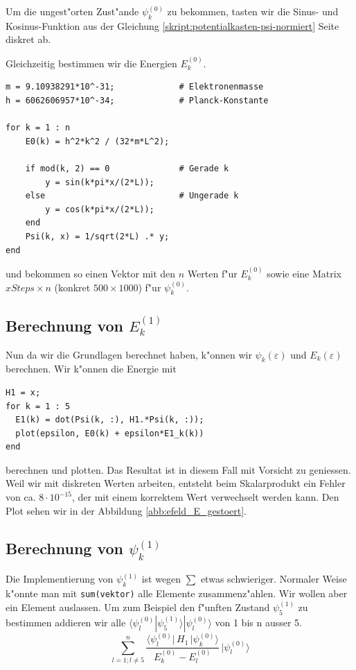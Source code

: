 \begin{refsection}
Um die ungest"orten Zust"ande $\psi_k^{(0)}$ zu bekommen, tasten wir die Sinus- und Kosinus-Funktion 
aus der Gleichung \ref{skript:potentialkasten-psi-normiert} Seite \pageref{skript:potentialkasten-psi-normiert} diskret ab.

Gleichzeitig bestimmen wir die Energien $E_k^{(0)}$.
\begin{lstlisting}[style=Matlab]
m = 9.10938291*10^-31;             # Elektronenmasse
h = 6062606957*10^-34;             # Planck-Konstante

for k = 1 : n
    E0(k) = h^2*k^2 / (32*m*L^2);
    
    if mod(k, 2) == 0              # Gerade k
        y = sin(k*pi*x/(2*L));
    else                           # Ungerade k
        y = cos(k*pi*x/(2*L));
    end
    Psi(k, x) = 1/sqrt(2*L) .* y;
end
\end{lstlisting}
und bekommen so einen Vektor mit den $n$ Werten f"ur $E_k^{(0)}$
sowie eine Matrix $xSteps \times n$ (konkret $500 \times 1000$) f"ur $\psi_k^{(0)}$.

\subsection{Berechnung von $E_k^{(1)}$}

Nun da wir die Grundlagen berechnet haben, k"onnen wir $\psi_k(\varepsilon)$ und $E_k(\varepsilon)$ berechnen.
Wir k"onnen die Energie mit
\begin{lstlisting}[style=Matlab]
H1 = x;
for k = 1 : 5
  E1(k) = dot(Psi(k, :), H1.*Psi(k, :));
  plot(epsilon, E0(k) + epsilon*E1_k(k))
end
\end{lstlisting}
berechnen und plotten.
Das Resultat ist in diesem Fall mit Vorsicht zu geniessen.
Weil wir mit diskreten Werten arbeiten, entsteht beim Skalarprodukt ein Fehler von ca. $8 \cdot 10^{-15}$,
der mit einem korrektem Wert verwechselt werden kann.
Den Plot sehen wir in der Abbildung \ref{abb:efeld_E_gestoert}.

\subsection{Berechnung von $\psi_k^{(1)}$}

Die Implementierung von $\psi_k^{(1)}$ ist wegen $\sum$ etwas schwieriger.
Normaler Weise k"onnte man mit \verb|sum(vektor)| alle Elemente zusammenz"ahlen.
Wir wollen aber ein Element auslassen.
Um zum Beispiel den f"unften Zustand $\psi_5^{(1)}$ zu bestimmen addieren wir alle 
$\langle\psi_l^{(0)}|\psi_5^{(1)}\rangle|\psi_l^{(0)}\rangle$
 von 1 bis n ausser 5.
\begin{equation}
  \sum_{l=1 ; l\ne 5}^{n}
    \frac{\langle \psi_l^{(0)}|\, H_1 \,|\psi_k^{(0)}\rangle}{E_k^{(0)}-E_l^{(0)}}
        \,
    |\psi_l^{(0)}\rangle
\end{equation}


\end{refsection}
